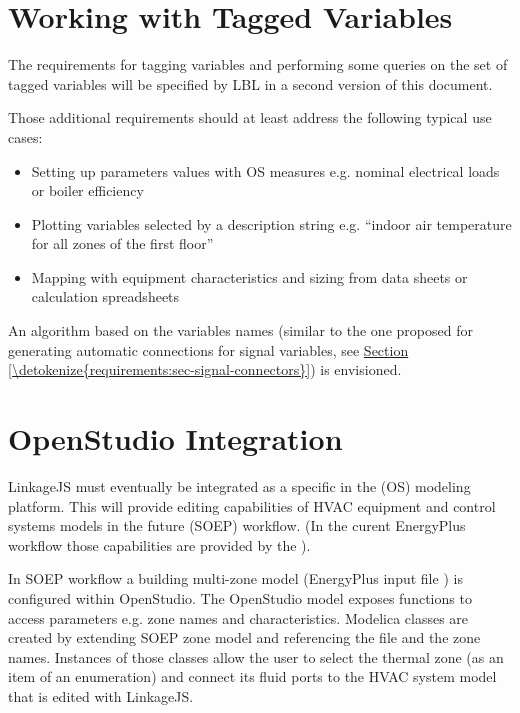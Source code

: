 \documentclass[letterpaper,10pt, openany,english]{sphinxmanual}
\begin{document}
\section{Working with Tagged Variables}
\label{\detokenize{requirements:working-with-tagged-variables}}\label{\detokenize{requirements:sec-tagged-variables}}
The requirements for tagging variables and performing some queries on the set of tagged variables will be specified by LBL in a second version of this document.

Those additional requirements should at least address the following typical use cases:
\begin{itemize}
\item {} 
Setting up parameters values with OS measures e.g. nominal electrical loads or boiler efficiency

\item {} 
Plotting variables selected by a description string e.g. “indoor air temperature for all zones of the first floor”

\item {} 
Mapping with equipment characteristics and sizing from data sheets or calculation spreadsheets

\end{itemize}

An algorithm based on the variables names (similar to the one proposed for generating automatic connections for signal variables, see \hyperref[\detokenize{requirements:sec-signal-connectors}]{Section \ref{\detokenize{requirements:sec-signal-connectors}}}) is envisioned.


\section{OpenStudio Integration}
\label{\detokenize{requirements:openstudio-integration}}
LinkageJS must eventually be integrated as a specific  in the  (OS) modeling platform. This will provide editing capabilities of HVAC equipment and control systems models in the future  (SOEP) workflow. (In the curent EnergyPlus workflow those capabilities are provided by the ).

In SOEP workflow a building multi-zone model (EnergyPlus input file ) is configured within OpenStudio. The OpenStudio model  exposes functions to access  parameters e.g. zone names and characteristics. Modelica classes are created by extending SOEP zone model and referencing the  file and the zone names. Instances of those classes allow the user to select the thermal zone (as an item of an enumeration) and connect its fluid ports to the HVAC system model that is edited with LinkageJS.
\end{document}
